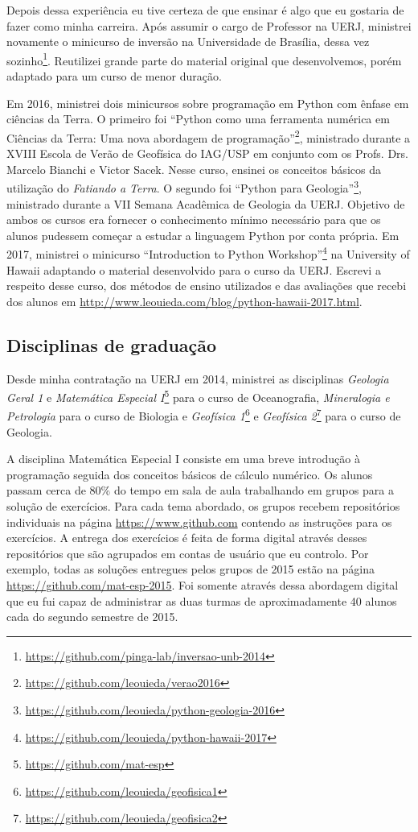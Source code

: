 Depois dessa experiência eu tive certeza de que ensinar é algo que eu gostaria
de fazer como minha carreira.
Após assumir o cargo de Professor na UERJ, ministrei novamente o minicurso de
inversão na Universidade de Brasília, dessa vez
sozinho\footnote{\url{https://github.com/pinga-lab/inversao-unb-2014}}.
Reutilizei grande parte do material original que desenvolvemos, porém adaptado
para um curso de menor duração.

Em 2016, ministrei dois minicursos sobre programação em Python com ênfase em
ciências da Terra.
O primeiro foi ``Python como uma ferramenta numérica em Ciências da
Terra: Uma nova abordagem de
programação''\footnote{\url{https://github.com/leouieda/verao2016}}, ministrado
durante
a XVIII Escola de Verão de Geofísica do IAG/USP em conjunto com os Profs. Drs.
Marcelo Bianchi e Victor Sacek.
Nesse curso, ensinei os conceitos básicos da utilização do \textit{Fatiando a
Terra}.
O segundo foi ``Python para
Geologia''\footnote{\url{https://github.com/leouieda/python-geologia-2016}},
ministrado durante a
VII Semana Acadêmica de Geologia da UERJ.
Objetivo de ambos os cursos era fornecer o conhecimento mínimo necessário para
que os alunos pudessem começar a estudar a linguagem Python por conta própria.
Em 2017, ministrei o minicurso ``Introduction to Python
Workshop''\footnote{\url{https://github.com/leouieda/python-hawaii-2017}} na
University of Hawaii adaptando o material desenvolvido para o curso da UERJ.
Escrevi a respeito desse curso, dos métodos de ensino utilizados e das
avaliações que recebi dos alunos em
\url{http://www.leouieda.com/blog/python-hawaii-2017.html}.


\subsection{Disciplinas de graduação}

Desde minha contratação na UERJ em 2014, ministrei as disciplinas
\textit{Geologia Geral 1} e \textit{Matemática Especial
I}\footnote{\url{https://github.com/mat-esp}} para o curso de
Oceanografia, \textit{Mineralogia e Petrologia} para o curso de Biologia e
\textit{Geofísica 1}\footnote{\url{https://github.com/leouieda/geofisica1}} e
\textit{Geofísica 2}\footnote{\url{https://github.com/leouieda/geofisica2}}
para o curso de Geologia.

A disciplina Matemática Especial I consiste em uma breve introdução à
programação seguida dos conceitos básicos de cálculo numérico.
Os alunos passam cerca de $80\%$ do tempo em sala de aula trabalhando em grupos
para a solução de exercícios.
Para cada tema abordado, os grupos recebem repositórios individuais na página
\url{https://www.github.com} contendo as instruções para os exercícios.
A entrega dos exercícios é feita de forma digital através desses repositórios
que são agrupados em contas de usuário que eu controlo.
Por exemplo, todas as soluções entregues pelos grupos de 2015 estão na página
\url{https://github.com/mat-esp-2015}.
Foi somente através dessa abordagem digital que eu fui capaz de administrar as
duas turmas de aproximadamente 40 alunos cada do segundo semestre de 2015.


